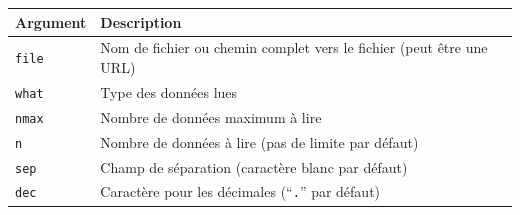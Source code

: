 \documentclass[
  11pt,
]{book}
\numberwithin{equation}{section}
\numberwithin{countremarque}{section}
\begin{document}
\begin{longtable}[]{@{}ll@{}}
\toprule
\begin{minipage}[b]{0.43\columnwidth}\raggedright
Argument\strut
\end{minipage} & \begin{minipage}[b]{0.51\columnwidth}\raggedright
Description\strut
\end{minipage}\tabularnewline
\midrule
\endhead
\begin{minipage}[t]{0.43\columnwidth}\raggedright
\texttt{file}\strut
\end{minipage} & \begin{minipage}[t]{0.51\columnwidth}\raggedright
Nom de fichier ou chemin complet vers le fichier (peut être une URL)\strut
\end{minipage}\tabularnewline
\begin{minipage}[t]{0.43\columnwidth}\raggedright
\texttt{what}\strut
\end{minipage} & \begin{minipage}[t]{0.51\columnwidth}\raggedright
Type des données lues\strut
\end{minipage}\tabularnewline
\begin{minipage}[t]{0.43\columnwidth}\raggedright
\texttt{nmax}\strut
\end{minipage} & \begin{minipage}[t]{0.51\columnwidth}\raggedright
Nombre de données maximum à lire\strut
\end{minipage}\tabularnewline
\begin{minipage}[t]{0.43\columnwidth}\raggedright
\texttt{n}\strut
\end{minipage} & \begin{minipage}[t]{0.51\columnwidth}\raggedright
Nombre de données à lire (pas de limite par défaut)\strut
\end{minipage}\tabularnewline
\begin{minipage}[t]{0.43\columnwidth}\raggedright
\texttt{sep}\strut
\end{minipage} & \begin{minipage}[t]{0.51\columnwidth}\raggedright
Champ de séparation (caractère blanc par défaut)\strut
\end{minipage}\tabularnewline
\begin{minipage}[t]{0.43\columnwidth}\raggedright
\texttt{dec}\strut
\end{minipage} & \begin{minipage}[t]{0.51\columnwidth}\raggedright
Caractère pour les décimales (``\texttt{.}'' par défaut)\strut

\end{minipage}
\end{longtable}
\end{document}
